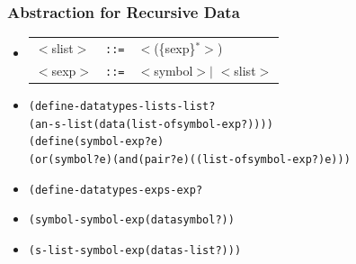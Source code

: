 \documentclass{beamer}
\newcommand{\is}{\texttt{::=}}
\begin{document}
\begin{frame}[fragile]
\frametitle{Abstraction for Recursive Data}
\begin{scriptsize}
\begin{itemize}
\item<1->
\begin{tabular}{lll}
   $<$slist$>$ & \is{} & $<$(\{sexp\}$^*>$) \\
   $<$sexp$>$  & \is{} & $<$symbol$> |$  $<$slist$>$
\end{tabular}

\item<2->
\begin{alltt}
(define-datatype s-list s-list?
  (an-s-list  (data  (list-of symbol-exp?))))
(define (symbol-exp? e)
  (or (symbol? e) (and (pair? e) ((list-of symbol-exp?) e)))
\end{alltt}

\item<3->
\begin{alltt}
(define-datatype s-exp s-exp?
\end{alltt}

\item<4->
\begin{alltt}
  (symbol-symbol-exp (data symbol?))
\end{alltt}

\item<5->
\begin{alltt}
  (s-list-symbol-exp (data s-list?)) )
\end{alltt}

\end{itemize}
\end{scriptsize}
\end{frame}
\end{document}
